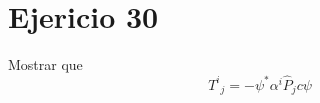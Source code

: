 \section*{Ejericio 30}
Mostrar que
\begin{equation*}
    {T^i}_j = -\psi^* \alpha^i \hat{P}_j c \psi
\end{equation*}